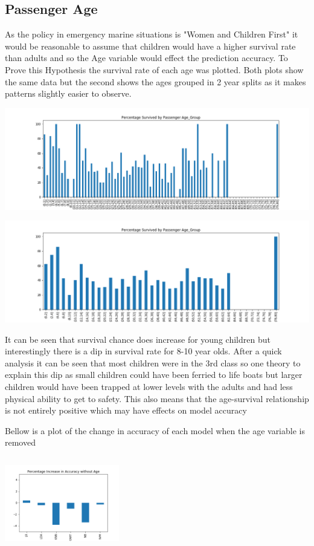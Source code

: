 \documentclass{article}
\begin{document}
\subsection{Passenger Age}
As the policy in emergency marine situations is "Women and Children First" it would be reasonable to assume that children would have a higher survival rate than adults and so the Age variable would effect the prediction accuracy. To Prove this Hypothesis the survival rate of each age was plotted. Both plots show the same data but the second shows the ages grouped in 2 year splits as it makes patterns slightly easier to observe.
\par
\includegraphics[width=\textwidth]{Percentage_Survived_by_Passenger_Age_Group}
\par
\includegraphics[width=\textwidth]{Percentage_Survived_by_Passenger_Age_Group_increment_2}
\par
It can be seen that survival chance does increase for young children but interestingly there is a dip in survival rate for 8-10 year olds. After a quick analysis it can be seen that most children were in the 3rd class so one theory to explain this dip as small children could have been ferried to life boats but larger children would have been trapped at lower levels with the adults and had less physical ability to get to safety. This also means that the age-survival relationship is not entirely positive which may have effects on model accuracy
\par
Bellow is a plot of the change in accuracy of each model when the age variable is removed
\par
\includegraphics[width=5cm, height=4cm]{Percentage_Increase_in_Accuracy_without_Age}
\end{document}
